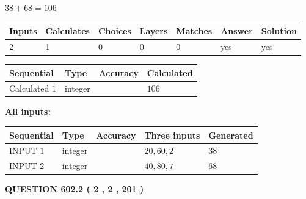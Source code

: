 \documentclass[12pt]{article}
\begin{document}
 

$ %
38 +  %
68=   %
106$
 
 
\noindent{}
 
 

 
   
   
   
   
\noindent\begin{tabular}{|l|l|l|l|l|l|l|}
 \hline
Inputs & Calculates & Choices & Layers & Matches & Answer & Solution \\ \hline
 2  & 
 1  & 
 0
  & 
 0  & 
 0  & 
  yes & 
  yes 
  \\ \hline
 \end{tabular}
   
   
   
   
\noindent{}
   
   
  
  
\noindent\begin{tabular}{|l|l|l|l|}
\hline
 Sequential & Type & Accuracy & Calculated \\ 
\hline
 
 
  Calculated $  1 $ & integer &  & 
  $ 106 $ 
 \\  \hline  
 \end{tabular}
   
   
   
   
\noindent\vspace{0.1in}\hspace{-0.08in} {\textbf{\Large{All inputs: }}}
   
   
  
  
\noindent\begin{tabular}{|l|l|l|l|l|}
\hline
 Sequential & Type & Accuracy & Three inputs & Generated \\ 
\hline
 
 
  INPUT $  1 $ & integer &  & $
 20
 , 
 60
 , 
 2
 $ & $ 38 $ 
 \\  \hline  
 
 
  INPUT $  2 $ & integer &  & $
 40
 , 
 80
 , 
 7
 $ & $ 68 $ 
 \\  \hline  
 \end{tabular}
   
   
  
\vspace{0.2in}
  
{\textbf{\Large{QUESTION
602.2 
 ( 2 , 2 , 201 )
}}}
  
\end{document}
